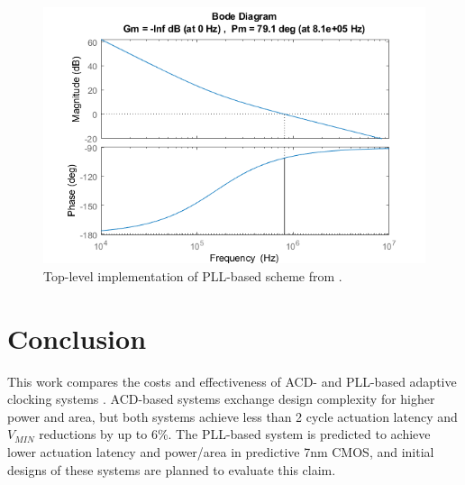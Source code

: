 \documentclass[twoside,9pt,journal,letterpage]{IEEEtran}
\begin{document}
\begin{figure}[h]
	\centering
	\includegraphics[width=0.9\columnwidth]{fig_phasemargin}
	\caption{Top-level implementation of PLL-based scheme from \cite{hashimoto2018}.}
	\label{fig:phase_margin}
\end{figure}

\section{Conclusion}
\label{sec:conclusion}

This work compares the costs and effectiveness of ACD- and PLL-based adaptive clocking systems \cite{hashimoto2018,wilcox2015}. ACD-based systems exchange design complexity for higher power and area, but both systems achieve less than 2 cycle actuation latency and $V_{MIN}$ reductions by up to 6\%. The PLL-based system is predicted to achieve lower actuation latency and power/area in predictive 7nm CMOS, and initial designs of these systems are planned to evaluate this claim.



\begingroup
\raggedright

\endgroup
\end{document}
